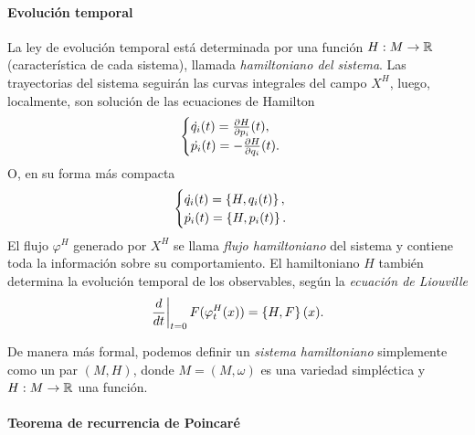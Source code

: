 \paragraph{\textbf{Evolución temporal}} La ley de evolución temporal está determinada por una función $H:M\rightarrow \mathbb{R}$ (característica de cada sistema), llamada \emph{hamiltoniano del sistema}. Las trayectorias del sistema seguirán las curvas integrales del campo $X^H$, luego, localmente, son solución de las ecuaciones de Hamilton
  \begin{equation*}
  \begin{cases}
     \dot{q_i}(t) = \frac{\partial H}{\partial p_i}(t), \\
     \dot{p_i}(t) = -\frac{\partial H}{\partial q_i} (t).
  \end{cases}
\end{equation*}
O, en su forma más compacta
  \begin{equation*}
    \begin{cases}
      \dot{q_i}(t)= \left\lbrace H,q_i(t)\right\rbrace, \\
      \dot{p_i}(t)= \left\lbrace H,p_i(t)\right\rbrace.
  \end{cases}
  \end{equation*}
  El flujo $\varphi^H$ generado por $X^H$ se llama \emph{flujo hamiltoniano} del sistema y contiene toda la información sobre su comportamiento. El hamiltoniano $H$ también determina la evolución temporal de los observables, según la \emph{ecuación de Liouville}
  \begin{equation*}
    \left.\frac{d}{dt}\right|_{t=0}F(\varphi_t^H(x))=\left\lbrace H,F\right\rbrace(x).
  \end{equation*}
  
  De manera más formal, podemos definir un \emph{sistema hamiltoniano} simplemente como un par $(M,H)$, donde $M=(M,\omega)$ es una variedad simpléctica y $H:M\rightarrow \mathbb{R}$ una función.
  
  \paragraph{\bf Teorema de recurrencia de Poincaré}\mbox{}

